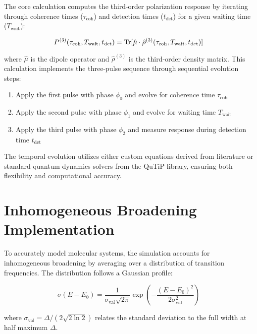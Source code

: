 \noindent
The core calculation computes the third-order polarization response by iterating through coherence times ($\tau_{\text{coh}}$) and detection times ($t_{\text{det}}$) for a given waiting time ($T_{\text{wait}}$):

\begin{equation}
    \label{eq:polarization_third_order}
    P^{(3)}(\tau_{\text{coh}}, T_{\text{wait}}, t_{\text{det}}) = \mathrm{Tr}[\hat{\mu} \cdot \hat{\rho}^{(3)}(\tau_{\text{coh}}, T_{\text{wait}}, t_{\text{det}})]
\end{equation}

\noindent
where $\hat{\mu}$ is the dipole operator and $\hat{\rho}^{(3)}$ is the third-order density matrix. This calculation implements the three-pulse sequence through sequential evolution steps:

\begin{enumerate}
    \item Apply the first pulse with phase $\phi_0$ and evolve for coherence time $\tau_{\text{coh}}$
    \item Apply the second pulse with phase $\phi_1$ and evolve for waiting time $T_{\text{wait}}$
    \item Apply the third pulse with phase $\phi_2$ and measure response during detection time $t_{\text{det}}$
\end{enumerate}

\noindent
The temporal evolution utilizes either custom equations derived from literature or standard quantum dynamics solvers from the QuTiP library, ensuring both flexibility and computational accuracy.

\section{Inhomogeneous Broadening Implementation}
\label{sec:inhomogeneous_broadening}

\noindent
To accurately model molecular systems, the simulation accounts for inhomogeneous broadening by averaging over a distribution of transition frequencies. The distribution follows a Gaussian profile:

\begin{equation}
    \label{eq:gaussian_distribution}
    \sigma(E - E_0) = \frac{1}{\sigma_{\text{val}}\sqrt{2\pi}} \exp\left(-\frac{(E-E_0)^2}{2\sigma_{\text{val}}^2}\right)
\end{equation}

\noindent
where $\sigma_{\text{val}} = \Delta/(2\sqrt{2\ln{2}})$ relates the standard deviation to the full width at half maximum $\Delta$.

